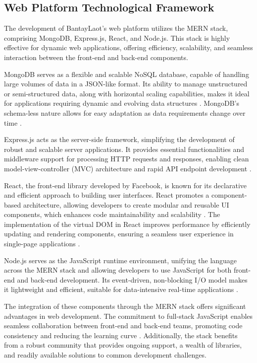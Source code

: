 \documentclass{icsthesis}
\begin{document}
\begin{mainmatter}
            \subsection{Web Platform Technological Framework}
            The development of BantayLaot’s web platform utilizes the MERN stack, comprising MongoDB, Express.js, React, and Node.js. This stack is highly effective for dynamic web applications, offering efficiency, scalability, and seamless interaction between the front-end and back-end components.
            
            MongoDB serves as a flexible and scalable NoSQL database, capable of handling large volumes of data in a JSON-like format. Its ability to manage unstructured or semi-structured data, along with horizontal scaling capabilities, makes it ideal for applications requiring dynamic and evolving data structures \citep{Baid2024}. MongoDB's schema-less nature allows for easy adaptation as data requirements change over time \citep{Bawane2022}.
            
            Express.js acts as the server-side framework, simplifying the development of robust and scalable server applications. It provides essential functionalities and middleware support for processing HTTP requests and responses, enabling clean model-view-controller (MVC) architecture and rapid API endpoint development \citep{Baid2024, Bawane2022}.
            
            React, the front-end library developed by Facebook, is known for its declarative and efficient approach to building user interfaces. React promotes a component-based architecture, allowing developers to create modular and reusable UI components, which enhances code maintainability and scalability \citep{Baid2024}. The implementation of the virtual DOM in React improves performance by efficiently updating and rendering components, ensuring a seamless user experience in single-page applications \citep{Bawane2022}.
            
            Node.js serves as the JavaScript runtime environment, unifying the language across the MERN stack and allowing developers to use JavaScript for both front-end and back-end development. Its event-driven, non-blocking I/O model makes it lightweight and efficient, suitable for data-intensive real-time applications \citep{Baid2024, Bawane2022}.
            
            The integration of these components through the MERN stack offers significant advantages in web development. The commitment to full-stack JavaScript enables seamless collaboration between front-end and back-end teams, promoting code consistency and reducing the learning curve \citep{Baid2024}. Additionally, the stack benefits from a robust community that provides ongoing support, a wealth of libraries, and readily available solutions to common development challenges.
            

\end{mainmatter}
\end{document}
